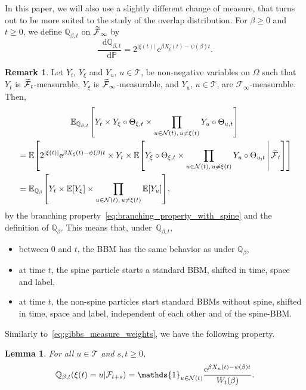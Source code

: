 \documentclass[10pt]{amsart}
\newtheorem{lemm}[theo]{Lemma}\newtheorem{prop}[theo]{Proposition}\newtheorem{coro}[theo]{Corollary}\newtheorem{conj}[theo]{Conjecture}
\theoremstyle{definition}\newtheorem{defi}[theo]{Definition}\newtheorem{rema}[theo]{Remark}\newtheorem{exam}[theo]{Example}\newtheorem{exem}[theo]{Example}\newtheorem{nota}[theo]{Notation}
\newcommand{\e}{\mathrm{e}}
\renewcommand{\d}[1]{\mathop{}\!\mathrm{d}#1}
\newcommand{\E}{\mathbb{E}}
\renewcommand{\P}{\mathbb{P}}
\newcommand{\Q}{\mathbb{Q}}
\newcommand\1{\mathds{1}}
\newcommand{\cF}{\mathcal{F}}
\newcommand{\cN}{\mathcal{N}}
\newcommand{\cT}{\mathcal{T}}
\let\oldtilde\tilde
\renewcommand*{\tilde}[1]{\mathchoice{\widetilde{#1}}{\widetilde{#1}}{\oldtilde{#1}}{\oldtilde{#1}}}
\let\originalleft\left
\let\originalright\right
\renewcommand{\left}{\mathopen{}\mathclose\bgroup\originalleft}
\renewcommand{\right}{\aftergroup\egroup\originalright}
\begin{document}
In this paper, we will also use a slightly different change of measure, that turns out to be more suited to the study of the overlap distribution. For $\beta \geq 0$ and $t \geq 0$, we define $\Q_{\beta, t}$ on $\tilde{\cF}_\infty$ by
\begin{equation}\label{eq:definition_of_Q_bt}
\frac{\d{\Q_{\beta, t}}}{\d{\P}} = 2^{|\xi(t)|}\, \e^{\beta X_\xi(t) - \psi(\beta) t}.
\end{equation}

\begin{rema}
Let $Y_t$, $Y_\xi$ and $Y_u$, $u \in \cT$, be non-negative variables on $\Omega$ such that $Y_t$ is $\tilde{\cF}_t$-measurable, $Y_\xi$ is $\tilde{\cF}_\infty$-measurable, and $Y_u$, $u \in \cT$, are $\cF_\infty$-measurable. Then,
\begin{multline}
\E_{\Q_{\beta, t}} \left[Y_t \times Y_\xi \circ \Theta_{\xi, t} \times \prod_{u \in \cN(t),\, u \neq \xi(t)} Y_u \circ \Theta_{u, t} \right]\\
\begin{aligned}
& = \E \left[2^{|\xi(t)|} \e^{\beta X_\xi(t) - \psi(\beta)t} \times Y_t \times \E \left[Y_\xi \circ \Theta_{\xi, t} \times \prod_{u \in \cN(t),\, u \neq \xi(t)} Y_u \circ \Theta_{u, t} \,\middle|\, \tilde{\cF}_t \right] \right]\\
& = \E_{\Q_\beta} \left[Y_t \times \E \left[Y_{\xi} \right] \times \prod_{u \in \cN(t),\, u \neq \xi(t)} \E \left[Y_u \right] \right],
\end{aligned}
\end{multline}
by the branching property~\eqref{eq:branching_property_with_spine} and the definition of $\Q_\beta$. This means that, under~$\Q_{\beta, t}$,
\begin{itemize}
\item between $0$ and $t$, the BBM has the same behavior as under $\Q_\beta$,
\item at time $t$, the spine particle starts a standard BBM, shifted in time, space and label,
\item at time $t$, the non-spine particles start standard BBMs without spine, shifted in time, space and label, independent of each other and of the spine-BBM.
\end{itemize}
\end{rema}

Similarly to~\eqref{eq:gibbs_measure_weights}, we have the following property.

\begin{lemm}\label{lem:gibbs_measure_weights}
For all $u \in \cT$ and $s, t \geq 0$,
\begin{equation*}
\Q_{\beta, t}\left(\xi(t) = u \middle| \cF_{t + s}\right) = \1_{u \in \cN(t)} \frac{\e^{\beta X_u(t) - \psi(\beta)t}}{W_t(\beta)}.
\end{equation*}
\end{lemm}
\end{document}
